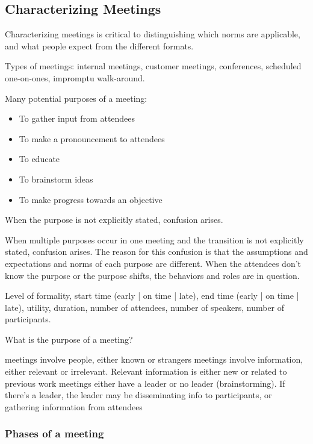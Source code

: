 \subsection{Characterizing Meetings}
Characterizing meetings is critical to distinguishing which norms are applicable, and what people expect from the different formats. 


Types of meetings: internal meetings, customer meetings, conferences, scheduled one-on-ones, impromptu walk-around.   

Many potential purposes of a meeting:
\begin{itemize}
    \item To gather input from attendees
    \item To make a pronouncement to attendees
    \item To educate
    \item To brainstorm ideas
    \item To make progress towards an objective
\end{itemize}
When the purpose is not explicitly stated, confusion arises.

When multiple purposes occur in one meeting and the transition is not explicitly stated, confusion arises.
The reason for this confusion is that the assumptions and expectations and norms of each purpose are different. When the attendees don't know the purpose or the purpose shifts, the behaviors and roles are in question.

Level of formality, start time (early | on time | late), 
end time (early | on time | late), utility, 
duration, number of attendees, number of speakers, number of participants.


What is the purpose of a meeting?

meetings involve people, either known or strangers
meetings involve information, either relevant or irrelevant. Relevant information is either new or related to previous work
meetings either have a leader or no leader (brainstorming). If there's a leader, the leader may be disseminating info to participants, or gathering information from attendees


\subsubsection{Phases of a meeting}

